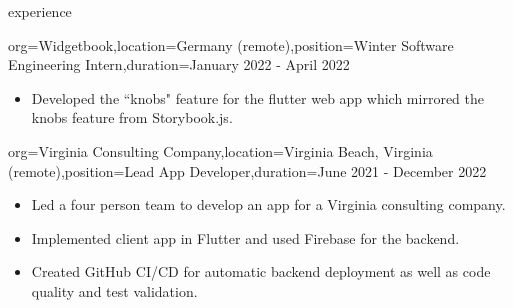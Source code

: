 \documentclass{resume}
\begin{document}
\begin{ResumeSection}{experience}
    \begin{ResumeSubsection}{org={Widgetbook},location={Germany (remote)},position={Winter Software Engineering Intern},duration={January 2022 - April 2022}}
        \begin{itemize}
            \item Developed the ``knobs" feature for the flutter web app which mirrored the knobs feature from
                Storybook.js.
        \end{itemize}
    \end{ResumeSubsection}

    \begin{ResumeSubsection}{org={Virginia Consulting
        Company},location={Virginia Beach, Virginia (remote)},position={Lead App
    Developer},duration={June 2021 - December 2022}}
        \begin{itemize}
            \item {Led a four person team to develop an app for a Virginia consulting company.}
            \item {Implemented client app in Flutter and used Firebase for the backend.}
            \item {Created GitHub CI/CD for automatic backend deployment as well as code quality and test validation.}
        \end{itemize}
    \end{ResumeSubsection}



\end{ResumeSection}
\end{document}

